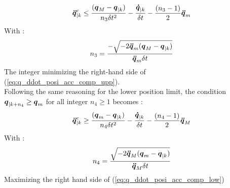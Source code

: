 \documentclass[a4paper, 10pt, conference]{ieeeconf}      %
\newcommand{\vect}[1]{\mbox{\boldmath${#1}$}}%
\begin{document}
{{\begin{equation}
\begin{split}
\vect{\ddot{q}}_{|k}^{c} \leq \frac{(\vect{q}_M-\vect{q}_{|k})}{n_3 \delta t^2} - \frac{\vect{\dot{q}}_{|k}}{\delta t} - \frac{(n_3-1)}{2} \vect{\ddot{q}}_m 
\label{eq:q_ddot_posi_acc_comp_upp}
\end{split}
\end{equation}
With : 
\begin{equation}
\begin{split}
n_3 = \frac{-\sqrt{-2 \vect{\ddot{q}}_m (\vect{q}_M - \vect{q}_{|k})}}{\vect{\ddot{q}}_m \delta t}
\label{eq:n_3_Acc_posi_comp}
\end{split}
\end{equation}
The integer minimizing the right-hand side of (\ref{eq:q_ddot_posi_acc_comp_upp}).
\\
Following the same reasoning for the lower position limit, the condition $\vect{q}_{|k+n_4} \geq \vect{q}_{m}$ for all integer $n_4 \geq 1$ becomes :
\begin{equation}
\begin{split}
\vect{\ddot{q}}_{|k}^{c} \geq \frac{(\vect{q}_m-\vect{q}_{|k})}{n_4 \delta t^2} - \frac{\vect{\dot{q}}_{|k}}{\delta t} - \frac{(n_4-1)}{2} \vect{\ddot{q}}_M 
\label{eq:q_ddot_posi_acc_comp_low}
\end{split}
\end{equation}
With : 
\begin{equation}
\begin{split}
n_4 = \frac{\sqrt{-2 \vect{\ddot{q}}_M (\vect{q}_m - \vect{q}_{|k})}}{\vect{\ddot{q}}_M \delta t}
\label{eq:n_4_Acc_posi_comp}
\end{split}
\end{equation}
Maximizing the right hand side of (\ref{eq:q_ddot_posi_acc_comp_low})
%
}}
\end{document}
